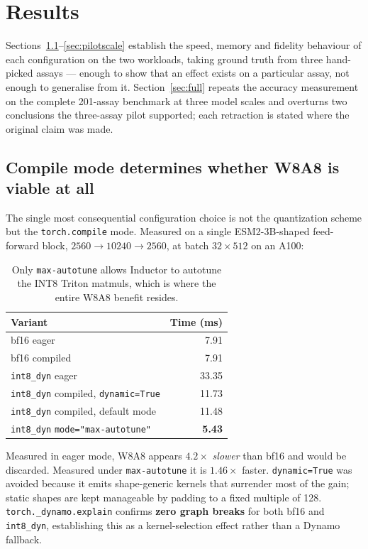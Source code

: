 \documentclass[11pt]{article}
\newcommand{\cfg}[1]{\texttt{#1}}
\newcommand{\best}[1]{\textbf{#1}}
\begin{document}
\section{Results}

Sections~\ref{sec:compile}--\ref{sec:pilotscale} establish the speed, memory and
fidelity behaviour of each configuration on the two workloads, taking ground
truth from three hand-picked assays --- enough to show that an effect exists on
a particular assay, not enough to generalise from it.
Section~\ref{sec:full} repeats the accuracy measurement on the complete
201-assay benchmark at three model scales and overturns two conclusions the
three-assay pilot supported; each retraction is stated where the original claim
was made.

\subsection{Compile mode determines whether W8A8 is viable at all}
\label{sec:compile}

The single most consequential configuration choice is not the quantization
scheme but the \texttt{torch.compile} mode. Measured on a single ESM2-3B-shaped
feed-forward block, $2560 \to 10240 \to 2560$, at batch $32 \times 512$ on an
A100:

\begin{table}[htb]
\centering
\caption{Only \texttt{max-autotune} allows Inductor to autotune the INT8 Triton
matmuls, which is where the entire W8A8 benefit resides.}
\small
\begin{tabular}{lr}
\toprule
Variant & Time (ms) \\
\midrule
bf16 eager                                   & 7.91 \\
bf16 compiled                                & 7.91 \\
\cfg{int8\_dyn} eager                        & 33.35 \\
\cfg{int8\_dyn} compiled, \texttt{dynamic=True} & 11.73 \\
\cfg{int8\_dyn} compiled, default mode       & 11.48 \\
\cfg{int8\_dyn} \texttt{mode="max-autotune"} & \best{5.43} \\
\bottomrule
\end{tabular}
\end{table}

Measured in eager mode, W8A8 appears $4.2\times$ \emph{slower} than bf16 and
would be discarded. Measured under \texttt{max-autotune} it is $1.46\times$
faster. \texttt{dynamic=True} was avoided because it emits shape-generic kernels
that surrender most of the gain; static shapes are kept manageable by padding to
a fixed multiple of 128. \texttt{torch.\_dynamo.explain} confirms \textbf{zero
graph breaks} for both bf16 and \cfg{int8\_dyn}, establishing this as a
kernel-selection effect rather than a Dynamo fallback.
\end{document}
